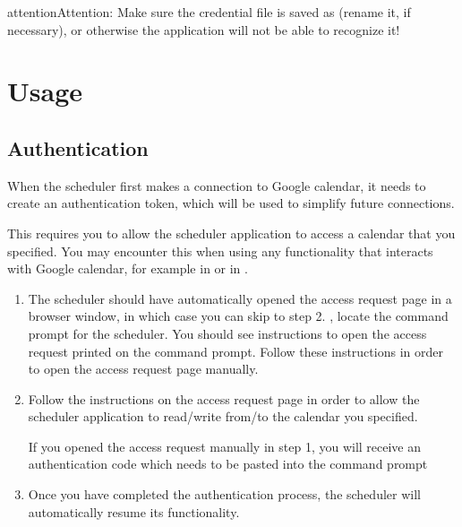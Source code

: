 \documentclass[letterpaper,10pt,english]{sphinxmanual}
\begin{document}
\begin{DUlineblock}{0em}
\item[] 
\end{DUlineblock}

\begin{sphinxadmonition}{attention}{Attention:}
Make sure the credential file is saved as  (rename it, if necessary),
or otherwise the application will not be able to recognize it!
\end{sphinxadmonition}


\chapter{Usage}
\label{\detokenize{index:usage}}

\section{Authentication}
\label{\detokenize{index:authentication}}\label{\detokenize{index:id1}}
When the scheduler first makes a connection to Google calendar, it needs
to create an authentication token, which will be used to simplify future
connections.

This requires you to allow the scheduler application to access a calendar
that you specified. You may encounter this when using any functionality that
interacts with Google calendar, for example in {\hyperref[\detokenize{index:generating-a-schedule}]{}}
or in {\hyperref[\detokenize{index:publishing-a-schedule-to-google-calendar}]{}}.
\begin{enumerate}
\item {} 
The scheduler should have automatically opened the access request page
in a browser window, in which case you can skip to step 2. ,
locate the command prompt for the scheduler. You should see instructions
to open the access request printed on the command prompt. Follow these instructions
in order to open the access request page manually.

\end{enumerate}
\begin{enumerate}
\setcounter{enumi}{1}
\item {} 
Follow the instructions on the access request page in order to allow
the scheduler application to read/write from/to the calendar you specified.

 If you opened the access request manually in step 1, you will
receive an authentication code which needs to be pasted into the command prompt

\end{enumerate}
\begin{enumerate}
\setcounter{enumi}{2}
\item {} 
Once you have completed the authentication process, the scheduler will
automatically resume its functionality.

\end{enumerate}
\end{document}
